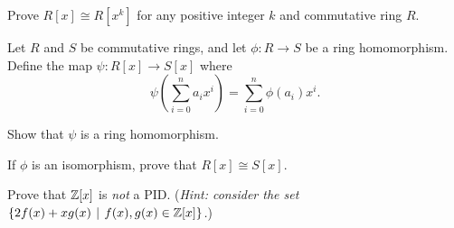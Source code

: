 \begin{problem}
    Prove $R[x] \cong R[x^k]$ for any positive integer $k$ and commutative ring $R$.
\end{problem}

\begin{problem}
    Let $R$ and $S$ be commutative rings, and let $\phi: R \to S$ be a ring homomorphism. Define the map $\psi: R[x] \to S[x]$ where
    \[
        \psi\left(\sum_{i=0}^na_ix^i\right) = \sum_{i=0}^n\phi(a_i)x^i.
    \]
    \begin{partquestions}{\roman*}
        \item Show that $\psi$ is a ring homomorphism.
        \item If $\phi$ is an isomorphism, prove that $R[x] \cong S[x]$.
    \end{partquestions}
\end{problem}

\begin{problem}\label{problem-Z[x]-is-not-a-PID}
    Prove that $\mathbb{Z}[x]$ is \textit{not} a PID.\newline
    (\textit{Hint: consider the set $\{2f(x) + xg(x) \vert f(x),g(x) \in \Z[x]\}$.})
\end{problem}
